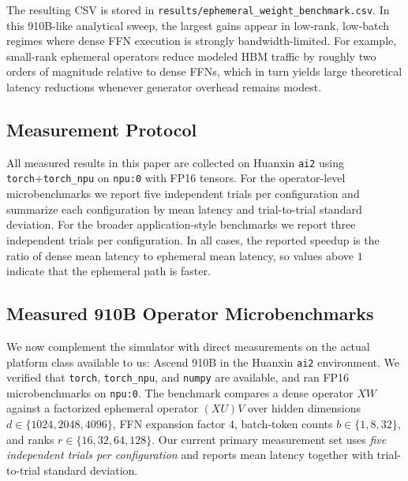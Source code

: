 \documentclass[11pt]{article}
\begin{document}
The resulting CSV is stored in \texttt{results/ephemeral\_weight\_benchmark.csv}. In this 910B-like analytical sweep, the largest gains appear in low-rank, low-batch regimes where dense FFN execution is strongly bandwidth-limited. For example, small-rank ephemeral operators reduce modeled HBM traffic by roughly two orders of magnitude relative to dense FFNs, which in turn yields large theoretical latency reductions whenever generator overhead remains modest.

\subsection{Measurement Protocol}
All measured results in this paper are collected on Huanxin \texttt{ai2} using \texttt{torch}+\texttt{torch\_npu} on \texttt{npu:0} with FP16 tensors. For the operator-level microbenchmarks we report five independent trials per configuration and summarize each configuration by mean latency and trial-to-trial standard deviation. For the broader application-style benchmarks we report three independent trials per configuration. In all cases, the reported speedup is the ratio of dense mean latency to ephemeral mean latency, so values above $1$ indicate that the ephemeral path is faster.

\subsection{Measured 910B Operator Microbenchmarks}
We now complement the simulator with direct measurements on the actual platform class available to us: Ascend 910B in the Huanxin \texttt{ai2} environment. We verified that \texttt{torch}, \texttt{torch\_npu}, and \texttt{numpy} are available, and ran FP16 microbenchmarks on \texttt{npu:0}. The benchmark compares a dense operator $XW$ against a factorized ephemeral operator $(XU)V$ over hidden dimensions $d \in \{1024,2048,4096\}$, FFN expansion factor $4$, batch-token counts $b \in \{1,8,32\}$, and ranks $r \in \{16,32,64,128\}$. Our current primary measurement set uses \emph{five independent trials per configuration} and reports mean latency together with trial-to-trial standard deviation.
\end{document}
